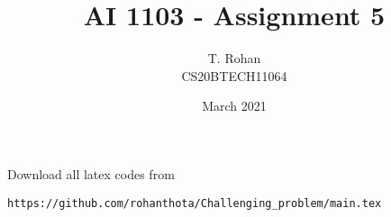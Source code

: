 \documentclass[journal,12pt,twocolumn]{IEEEtran}
\date{March 2021}
\DeclareMathOperator*{\Res}{Res}
\begin{document}
\newcommand{\BEQA}{\begin{eqnarray}}
\newcommand{\EEQA}{\end{eqnarray}}
\newcommand{\define}{\stackrel{\triangle}{=}}

\raggedbottom
\setlength{\parindent}{0pt}
\providecommand{\mbf}{\mathbf}
\providecommand{\pr}[1]{\ensuremath{\Pr\left(#1\right)}}
\providecommand{\qfunc}[1]{\ensuremath{Q\left(#1\right)}}
\providecommand{\fn}[1]{\ensuremath{f\left(#1\right)}}
\providecommand{\e}[1]{\ensuremath{E\left(#1\right)}}
\providecommand{\sbrak}[1]{\ensuremath{{}\left[#1\right]}}
\providecommand{\lsbrak}[1]{\ensuremath{{}\left[#1\right.}}
\providecommand{\rsbrak}[1]{\ensuremath{{}\left.#1\right]}}
\providecommand{\brak}[1]{\ensuremath{\left(#1\right)}}
\providecommand{\lbrak}[1]{\ensuremath{\left(#1\right.}}
\providecommand{\rbrak}[1]{\ensuremath{\left.#1\right)}}
\providecommand{\cbrak}[1]{\ensuremath{\left\{#1\right\}}}
\providecommand{\lcbrak}[1]{\ensuremath{\left\{#1\right.}}
\providecommand{\rcbrak}[1]{\ensuremath{\left.#1\right\}}}
\theoremstyle{remark}
\newtheorem{rem}{Remark}
\newcommand{\sgn}{\mathop{\mathrm{sgn}}}
\providecommand{\abs}[1]{\vert#1\vert}
\providecommand{\res}[1]{\Res\displaylimits_{#1}} 
\providecommand{\norm}[1]{\lVert#1\rVert}
\providecommand{\mtx}[1]{\mathbf{#1}}
\providecommand{\mean}[1]{E[ #1 ]}
\providecommand{\fourier}{\overset{\mathcal{F}}{ \rightleftharpoons}}
\providecommand{\system}{\overset{\mathcal{H}}{ \longleftrightarrow}}
\newcommand{\solution}{\noindent \textbf{Solution: }}
\newcommand{\cosec}{\,\text{cosec}\,}
\providecommand{\dec}[2]{\ensuremath{\overset{#1}{\underset{#2}{\gtrless}}}}
\newcommand{\myvec}[1]{\ensuremath{\begin{pmatrix}#1\end{pmatrix}}}
\newcommand{\mydet}[1]{\ensuremath{\begin{vmatrix}#1\end{vmatrix}}}
\makeatletter
{}
\makeatother
\let\StandardTheFigure\thefigure
\let\vec\mathbf
\renewcommand{\thefigure}{\theproblem}
\def\putbox#1#2#3{\makebox[0in][l]{\makebox[#1][l]{}\raisebox{\baselineskip}[0in][0in]{\raisebox{#2}[0in][0in]{#3}}}}
     \def\rightbox#1{\makebox[0in][r]{#1}}
     \def\centbox#1{\makebox[0in]{#1}}
     \def\topbox#1{\raisebox{-\baselineskip}[0in][0in]{#1}}
     \def\midbox#1{\raisebox{-0.5\baselineskip}[0in][0in]{#1}}
\vspace{3cm}
\title{AI 1103 - Assignment 5}
\author{T. Rohan \\ CS20BTECH11064}
\maketitle
\newpage
\bigskip
\renewcommand{\thefigure}{\theenumi}
\renewcommand{\thetable}{\theenumi}
Download all latex codes from 
\begin{lstlisting}
https://github.com/rohanthota/Challenging_problem/main.tex
\end{lstlisting}
\end{document}
